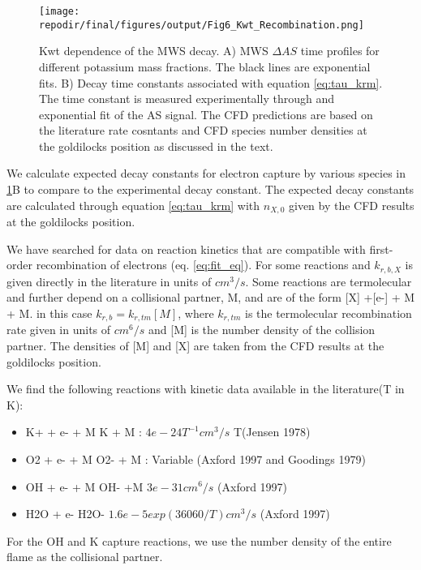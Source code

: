 \begin{figure}[h]
    \texttt{[image: \\repodir/final/figures/output/Fig6\_Kwt\_Recombination.png]} 
    \centering
    \caption{Kwt dependence of the MWS decay. A) MWS $\Delta AS$ time profiles for different potassium mass fractions. The black lines are exponential fits. B) Decay time constants associated with equation \ref{eq:tau_krm}. The time constant is measured experimentally through and exponential fit of the AS signal. The CFD predictions are based on the literature rate cosntants and CFD species number densities at the goldilocks position as discussed in the text.  }
    \label{fig:kwt_recombination}
\end{figure}



We calculate expected decay constants for electron capture by various species in \ref{fig:kwt_recombination}B to compare to the experimental decay constant. The expected decay constants are calculated through equation \ref{eq:tau_krm} with $n_{X,0}$ given by the CFD results at the goldilocks position. 

We have searched for data on reaction kinetics that are compatible with first-order recombination of electrons (eq. \ref{eq:fit_eq}). For some reactions and $k_{r,b,X}$ is given directly in the literature in units of $cm^3/s$. Some reactions are termolecular and further depend on a collisional partner, M, and are of the form [X] +[e-] + M \rightarrow [X-] + M. in this case $k_{r,b} = k_{r,tm} [M]$, where $k_{r,tm}$ is the termolecular recombination rate given in units of $cm^6/s$ and [M] is the number density of the collision partner.  The densities of [M] and [X] are taken from the CFD results at the goldilocks position.

We find the following reactions with kinetic data available in the literature(T in K):

\begin{itemize}
    \item K+ + e- + M \rightarrow K + M : $4e-24 T^{-1} cm^3/s$ T(Jensen 1978) 
    \item O2 + e- + M \rightarrow O2- + M : Variable (Axford 1997 and Goodings 1979)
    \item OH + e- + M \rightarrow OH- +M  $3e-31 cm^6/s$ (Axford 1997)
    \item H2O + e- \rightarrow H2O- $1.6e-5 exp(36060/T) cm^3/s$ (Axford 1997)
\end{itemize}

For the OH and K capture reactions, we use the number density of the entire flame as the collisional partner. 

